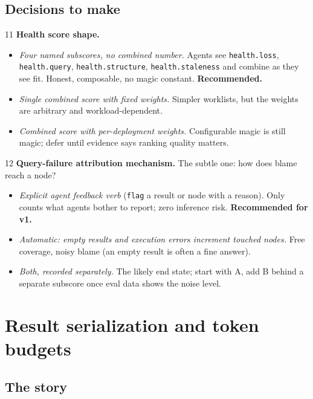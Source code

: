 \documentclass[11pt]{article}
\begin{document}
\subsection{Decisions to make}

\begin{decisionbox}{11}
\textbf{Health score shape.}
\begin{itemize}[leftmargin=1.4em,itemsep=1pt]
  \item[A.] \emph{Four named subscores, no combined number.} Agents see \texttt{health.loss}, \texttt{health.query}, \texttt{health.structure}, \texttt{health.staleness} and combine as they see fit. Honest, composable, no magic constant. \textbf{Recommended.}
  \item[B.] \emph{Single combined score with fixed weights.} Simpler worklists, but the weights are arbitrary and workload-dependent.
  \item[C.] \emph{Combined score with per-deployment weights.} Configurable magic is still magic; defer until evidence says ranking quality matters.
\end{itemize}
\end{decisionbox}

\begin{decisionbox}{12}
\textbf{Query-failure attribution mechanism.} The subtle one: how does blame reach a node?
\begin{itemize}[leftmargin=1.4em,itemsep=1pt]
  \item[A.] \emph{Explicit agent feedback verb} (\texttt{flag} a result or node with a reason). Only counts what agents bother to report; zero inference risk. \textbf{Recommended for v1.}
  \item[B.] \emph{Automatic: empty results and execution errors increment touched nodes.} Free coverage, noisy blame (an empty result is often a fine answer).
  \item[C.] \emph{Both, recorded separately.} The likely end state; start with A, add B behind a separate subscore once eval data shows the noise level.
\end{itemize}
\end{decisionbox}

\section{Result serialization and token budgets}

\subsection{The story}
\end{document}
